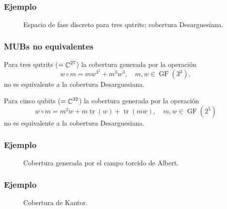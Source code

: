 \documentclass[10pt, spanish]{beamer}
\DeclareMathOperator{\C}{\mathbb{C}}
\let\H\relax
\DeclareMathOperator{\H}{\mathcal H}
\DeclareMathOperator{\tr}{tr}
\DeclareMathOperator{\GF}{GF}
\begin{document}
  \begin{frame}
    \frametitle{Ejemplo}

    \begin{figure}[h]
      \centering
      \scalebox{0.45}{
        
      }
      \caption{Espacio de fase discreto para tres qutrits; cobertura Desarguesiana.}
      \label{fig:affine-desargues-3-3}
    \end{figure}
  \end{frame}

  \begin{frame}
    \frametitle{MUBs no equivalentes}

    \begin{example}
      Para tres qutrits ($\H = \C^{27}$) la cobertura
      generada por la operación
      \begin{equation}
        w \circ m = m w^{3^2} + m^{3} w^{3},
        \quad m,w \in \GF(3^{3}),
      \end{equation}
      no es equivalente a la cobertura Desarguesiana.
    \end{example}

    \begin{example}[Kantor]
      Para cinco qubits ($\H = \C^{32}$) la cobertura
      generada por la operación
      \begin{equation}
        w \circ m = m^2 w + m \tr(w) + \tr(mw),
        \quad m,w \in \GF(2^{5})
      \end{equation}
      no es equivalente a la cobertura Desarguesiana.
    \end{example}
  \end{frame}

  \begin{frame}
    \frametitle{Ejemplo}
    \begin{figure}[h]
      \centering
      \scalebox{0.5}{
        
      }
      \caption{Cobertura generada por el campo torcido de
      Albert.}
      \label{fig:affine-albert-3-3}
    \end{figure}
  \end{frame}

  \begin{frame}
    \frametitle{Ejemplo}
    \begin{figure}[h]
      \centering
      \scalebox{0.5}{
        
      }
      \caption{Cobertura de Kantor.}
      \label{fig:affine-kantor-2-5}
    \end{figure}
  \end{frame}
\end{document}
